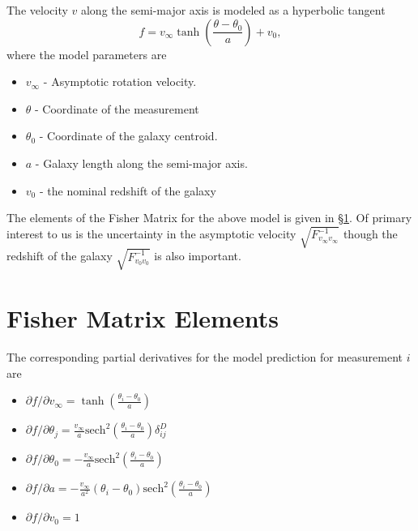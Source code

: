 \documentclass[11pt, oneside]{article}   	%
\begin{document}
The velocity $v$ along the semi-major axis is modeled as a hyperbolic tangent
\begin{equation}
f=v_\infty \tanh{\left(\frac{\theta - \theta_0}{a}\right)} + v_0,
\end{equation}
where the model parameters are
\begin{itemize}
\item $v_\infty$ - Asymptotic rotation velocity.
\item $\theta$ - Coordinate of the measurement
\item $\theta_0$ - Coordinate of the galaxy centroid. 
\item $a$ - Galaxy length along the semi-major axis.
\item $v_0$ - the nominal redshift of the galaxy
\end{itemize}


The elements of the Fisher Matrix for the above model is given in \S\ref{sec:fisher}.
Of primary interest to us is the uncertainty in the asymptotic velocity $\sqrt{F^{-1}_{v_\infty v_\infty}}$ though
the redshift of the galaxy  $\sqrt{F^{-1}_{v_0 v_0}}$ is also important.

\appendix
\section{Fisher Matrix Elements}
\label{sec:fisher}
The corresponding partial derivatives for the model prediction for measurement $i$ are
\begin{itemize}
\item $\partial f/ \partial v_\infty =  \tanh{\left(\frac{\theta_i - \theta_0}{a}\right)}$
\item $\partial f/ \partial\theta_j = \frac{v_\infty }{a} \text{sech}^2{\left(\frac{\theta_i - \theta_0}{a}\right)} \delta^D_{ij}$ 
\item $\partial f/ \partial\theta_0 = -\frac{v_\infty }{a} \text{sech}^2{\left(\frac{\theta_i - \theta_0}{a}\right)}$ 
\item $\partial f/ \partial a =-\frac{v_\infty }{a^2} (\theta_i - \theta_0)\text{sech}^2{\left(\frac{\theta_i - \theta_0}{a}\right)}$
\item $\partial f/ \partial v_0 =1$
\end{itemize}
\end{document}
